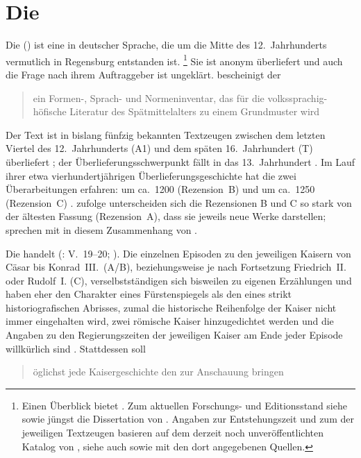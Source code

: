 
\section{Die }
\label{sec:materialkc}

Die  (\KC{}) ist eine  in deutscher
Sprache, die um die Mitte des 12.~Jahrhunderts vermutlich in Regensburg
entstanden ist.%
%
	\footnote{Einen Überblick bietet \citet{nellmann1983}. Zum aktuellen
		Forschungs- und Editionsstand siehe
		\citet{chincaetal2019a} sowie jüngst die Dissertation von
		\citet{weis2022}. Angaben zur Entstehungszeit und zum
		 der jeweiligen Textzeugen basieren auf dem derzeit
		noch unveröffentlichten Katalog von \citet{wolf:kckat}, siehe auch
		\nocite{kcdigital} sowie
		\citet[s.\,v.~]{hsc} mit den dort angegebenen
		Quellen.}
%
Sie ist anonym überliefert und auch die Frage nach ihrem Auftraggeber ist
ungeklärt. \citet[92]{wolf2008} bescheinigt der \KC{}
\blockquote{ein Formen-, Sprach- und Normeninventar, das für die
volks\-sprachig-höfische Literatur des Spätmittelalters zu einem Grundmuster
wird}.

Der Text ist in bislang fünfzig bekannten Textzeugen zwischen dem letzten
Viertel des 12.~Jahrhunderts (A1) und dem späten 16.~Jahrhundert (T)
überliefert \autocite[39, 57]{wolf:kckat}; der
Überlieferungsschwerpunkt fällt in das 13.~Jahrhundert
\autocites[vgl.][s.\,v.~]{hsc}{kcdigital}. Im Lauf ihrer
etwa vierhundertjährigen Überlieferungsgeschichte hat die \KC{} zwei
Überarbeitungen erfahren: um ca.~1200 (Rezension~B) und um ca.~1250
(Rezension~C) \autocites{wolf2008}. \citet[369]{gaertner1995} zufolge
unterscheiden sich die Rezensionen B und C so stark von der ältesten Fassung
(Rezension~A), dass sie jeweils neue Werke darstellen;
\citet[142]{chincaetal2019a} sprechen mit \citet{bumkepeters2005} in diesem
Zusammenhang von .

Die \KC{} handelt   (\KC: V.~19--20; \cite[79]{schroeder1895}). Die einzelnen Episoden
zu den jeweiligen Kaisern von Cäsar bis Konrad~III.\ (A/B), beziehungsweise je
nach Fortsetzung Friedrich~II. oder Rudolf~I. (C), verselbstständigen sich
bisweilen zu eigenen Erzählungen und haben eher den Charakter eines
Fürstenspiegels als den eines strikt historiografischen
Abrisses, zumal die historische Reihenfolge der Kaiser nicht immer eingehalten
wird, zwei römische Kaiser hinzugedichtet werden und die Angaben zu den
Regierungszeiten der jeweiligen Kaiser am Ende jeder Episode willkürlich sind
\autocite[954--960]{nellmann1983}. Stattdessen soll
\blockcquote[957]{nellmann1983}{öglichst jede Kaisergeschichte
\textelp{} den  \textelp{} zur Anschauung bringen}.

